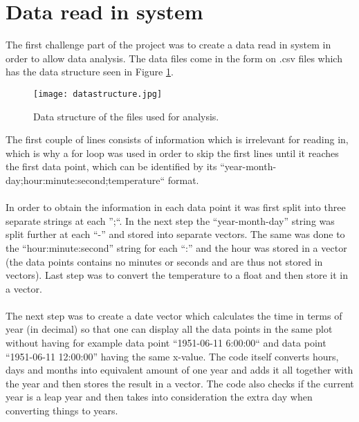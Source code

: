 \documentclass[../main.tex]{subfiles}
\begin{document}
\section{Data read in system}
	The first challenge part of the project was to create a data read in system in order to allow data analysis. The data files come in the form on .csv files which has
	the data structure seen in Figure \ref{datastructure}.
	\begin{figure}[!h]
	  \centering
	  \texttt{[image: datastructure.jpg]}
	  \caption{Data structure of the files used for analysis.}
	  \label{datastructure}
	 
	\end{figure}\noindent
	The first couple of lines consists of information which is irrelevant for reading in, which is why a for loop was used in order to skip the first lines until it reaches 
	the first data point, which can be identified by its ``year-month-day;hour:minute:second;temperature`` format.
	\\\\
	In order to obtain the information in each data point it was first split into three separate strings at each '';``. In the next step the ``year-month-day'' string was split 
	further at each ``-'' and stored into separate vectors. The same was done to the ``hour:minute:second'' string for each ``:'' and the hour was stored in a 
	vector (the data points contains no minutes or seconds and are thus not stored in vectors). Last step was to convert the temperature to a float and then store it in a vector. 
	\\\\
	The next step was to create a date vector which calculates the time in terms of year (in decimal) so that one can display all the data points in the same plot without having 
	for example data point ``1951-06-11 6:00:00`` and data point ``1951-06-11 12:00:00'' having the same x-value. The code itself converts hours, days and months into equivalent 
	amount of one year and adds it all together with the year and then stores the result in a vector. The code also checks if the current year is a leap year and then takes 
	into consideration the extra day when converting things to years.
\end{document}
